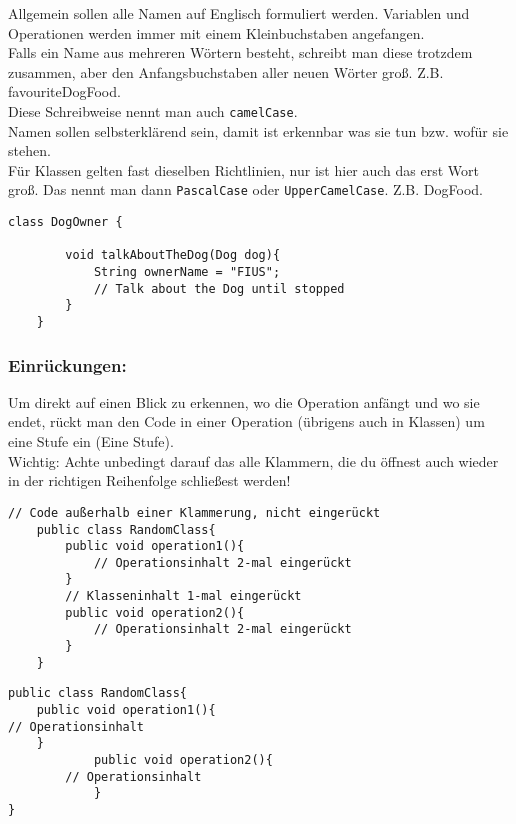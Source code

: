 \noindent
Allgemein sollen alle Namen auf Englisch formuliert werden.
Variablen und Operationen werden immer mit einem Kleinbuchstaben angefangen.\\

\noindent
Falls ein Name aus mehreren Wörtern besteht, schreibt man diese trotzdem zusammen, aber den Anfangsbuchstaben aller neuen Wörter groß. Z.B. favouriteDogFood.\\
Diese Schreibweise nennt man auch \lstinline{camelCase}.\\

\noindent
Namen sollen selbsterklärend sein, damit ist erkennbar was sie tun bzw. wofür sie stehen.\\

\noindent
Für Klassen gelten fast dieselben Richtlinien, nur ist hier auch das erst Wort groß.
Das nennt man dann \lstinline{PascalCase} oder \lstinline{UpperCamelCase}. Z.B. DogFood.

\vspace{5mm}

\begin{lstlisting}[title=\textbf{Beispiel gute Namensgebung}]
	class DogOwner {

		void talkAboutTheDog(Dog dog){
			String ownerName = "FIUS";
			// Talk about the Dog until stopped
		}
	}
\end{lstlisting}

\subsubsection*{Einrückungen:}
Um direkt auf einen Blick zu erkennen, wo die Operation anfängt und wo sie endet, rückt man den Code in einer Operation (übrigens auch in Klassen) um eine Stufe ein (Eine  Stufe).\\

\noindent
{\color{red} Wichtig: }Achte unbedingt darauf das alle Klammern, die du öffnest auch wieder in der richtigen Reihenfolge schließest werden!


\begin{lstlisting}[title=\textbf{Beispiel gute Namensgebung}]
	// Code außerhalb einer Klammerung, nicht eingerückt
	public class RandomClass{
		public void operation1(){
			// Operationsinhalt 2-mal eingerückt
		}
		// Klasseninhalt 1-mal eingerückt
		public void operation2(){
			// Operationsinhalt 2-mal eingerückt
		}
	}
\end{lstlisting}

\begin{lstlisting}[title=\textbf{Beispiel schlechte Einrückung}]
	public class RandomClass{
	public void operation1(){
// Operationsinhalt
	}
			public void operation2(){
		// Operationsinhalt
			}
}
\end{lstlisting}

